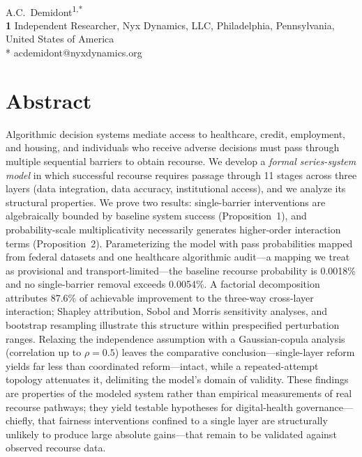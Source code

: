\documentclass[10pt,letterpaper]{article}
\begin{document}
\vspace*{0.2in}

\begin{flushleft}
{\Large
\textbf{}
}
\newline
\\
A.C.\ Demidont\textsuperscript{1,*}
\\
\bigskip
\textbf{1} Independent Researcher, Nyx Dynamics, LLC, Philadelphia, Pennsylvania, United States of America
\\
\bigskip
* acdemidont@nyxdynamics.org
\end{flushleft}

\section*{Abstract}
Algorithmic decision systems mediate access to healthcare, credit, employment, and housing, and individuals who receive adverse decisions must pass through multiple sequential barriers to obtain recourse. We develop a \emph{formal series-system model} in which successful recourse requires passage through 11 stages across three layers (data integration, data accuracy, institutional access), and we analyze its structural properties. We prove two results: single-barrier interventions are algebraically bounded by baseline system success (Proposition~1), and probability-scale multiplicativity necessarily generates higher-order interaction terms (Proposition~2). Parameterizing the model with pass probabilities mapped from federal datasets and one healthcare algorithmic audit---a mapping we treat as provisional and transport-limited---the baseline recourse probability is 0.0018\% and no single-barrier removal exceeds 0.0054\%. A factorial decomposition attributes 87.6\% of achievable improvement to the three-way cross-layer interaction; Shapley attribution, Sobol and Morris sensitivity analyses, and bootstrap resampling illustrate this structure within prespecified perturbation ranges. Relaxing the independence assumption with a Gaussian-copula analysis (correlation up to $\rho=0.5$) leaves the comparative conclusion---single-layer reform yields far less than coordinated reform---intact, while a repeated-attempt topology attenuates it, delimiting the model's domain of validity. These findings are properties of the modeled system rather than empirical measurements of real recourse pathways; they yield testable hypotheses for digital-health governance---chiefly, that fairness interventions confined to a single layer are structurally unlikely to produce large absolute gains---that remain to be validated against observed recourse data.
\end{document}
